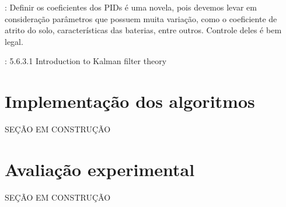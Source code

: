 \cite{samani2007comprehensive}: Definir os coeficientes dos PIDs é uma novela, pois devemos levar em consideração parâmetros que possuem muita variação, como o coeficiente de atrito do solo, características das baterias, entre outros. Controle deles é bem legal.





\cite{siegwart2011introduction}: 5.6.3.1 Introduction to Kalman filter theory



\section{Implementação dos algoritmos}
\label{sec:software}

SEÇÃO EM CONSTRUÇÃO

\section{Avaliação experimental}
\label{sec:experimental}

SEÇÃO EM CONSTRUÇÃO
